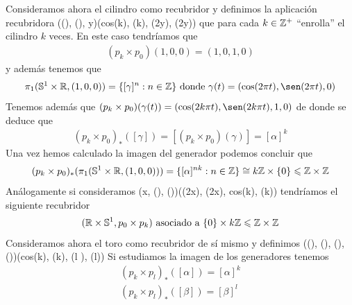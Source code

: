\begin{ejemplo}
\begin{enumerate}
        Consideramos ahora el cilindro como recubridor y definimos la aplicación recubridora
             {(\cos(\theta), \sen(\theta), y)}{(cos(k\theta), \sen(k\theta), \cos(2\pi y), \sen(2\pi y))}
        que para cada $k\in \mathbb{Z}^+$ ``enrolla'' el cilindro $k$ veces. 
        En este caso tendríamos que 
        \begin{gather*}
            (p_k\times p_0)(1,0,0) = (1,0,1,0)
        \end{gather*}
        y además tenemos que 
        \begin{gather*}
            \pi_1(\bb{S}^1 \times \bb{R}, (1,0,0)) = \{[\gamma]^n : n\in \bb{Z}\} \text{ donde } \gamma(t)=(\cos(2\pi t), \sen(2\pi t), 0)
        \end{gather*}
        Tenemos además que $(p_k\times p_0)(\gamma(t)) = (\cos(2k\pi t), \sen(2k\pi t), 1, 0)$ de donde se deduce que
        \begin{gather*}
            (p_k \times p_0)_*([\gamma]) = [(p_k\times p_0)(\gamma)]
            = [\alpha]^k 
        \end{gather*}
        Una vez hemos calculado la imagen del generador podemos concluir que 
        \begin{gather*}
            (p_k\times p_0)_*(\pi_1(\mathbb{S}^1 \times \mathbb{R}, (1,0,0))) = \{[\alpha]^{nk} : n\in \mathbb{Z}\} \cong k\mathbb{Z}\times \{0\} \leqslant \mathbb{Z} \times \mathbb{Z}
        \end{gather*}
        Análogamente si consideramos 
             {(x,  \cos(\theta), \sen(\theta))}{(\cos(2\pi x), \sen(2\pi x), cos(k\theta), \sen(k\theta))}
        tendríamos el siguiente recubridor
        \begin{gather*}
            (\mathbb{R}\times \mathbb{S}^1, p_0\times p_k) \text{ asociado a } \{0\}\times k\mathbb{Z} \leqslant \mathbb{Z}\times \mathbb{Z}
        \end{gather*}
        Consideramos ahora el toro como recubridor de sí mismo y definimos
             {(\cos(\theta), \sen(\theta), \cos(\varphi), \sen(\varphi))}{(cos(k\theta), \sen(k\theta), \cos(l \varphi), \sen(l\varphi))}
        Si estudiamos la imagen de los generadores tenemos 
        \begin{gather*}
            (p_k\times p_l)_*([\alpha]) = [\alpha]^k\\
            (p_k\times p_l)_*([\beta]) = [\beta]^l

\end{gather*}
\end{enumerate}
\end{ejemplo}
